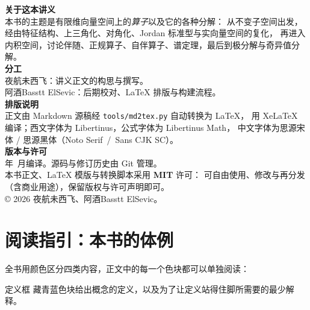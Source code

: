 \documentclass[UTF8, fontset=none, 11pt, twoside, openright]{ctexbook}
\newcommand{\authorone}{夜航未西飞}
\newcommand{\authortwo}{阿酒\;\textbullet\;Basstt ElSevic}
\newcommand{\bookdate}{\the\year 年\ \the\month 月}
\begin{document}
\thispagestyle{empty}
\null\vfill
\begin{flushleft}
\small\color{black!75}
\textsf{\textbf{\color{inkblue}关于这本讲义}}\\[4pt]
本书的主题是有限维向量空间上的\emph{算子}以及它的各种分解：
从不变子空间出发，经由特征结构、上三角化、对角化、Jordan 标准型与实向量空间的复化，
再进入内积空间，讨论伴随、正规算子、自伴算子、谱定理，最后到极分解与奇异值分解。\\[10pt]

\textsf{\textbf{\color{inkblue}分工}}\\[4pt]
\authorone{}：讲义正文的构思与撰写。\\
\authortwo{}：后期校对、\LaTeX{} 排版与构建流程。\\[10pt]

\textsf{\textbf{\color{inkblue}排版说明}}\\[4pt]
正文由 Markdown 源稿经 \texttt{tools/md2tex.py} 自动转换为 \LaTeX{}，
用 XeLaTeX 编译；西文字体为 Libertinus，公式字体为 Libertinus Math，
中文字体为思源宋体 / 思源黑体（Noto Serif~/~Sans CJK SC）。\\[10pt]

\textsf{\textbf{\color{inkblue}版本与许可}}\\[4pt]
\bookdate 编译。源码与修订历史由 Git 管理。\\
本书正文、\LaTeX{} 模版与转换脚本采用 \textbf{MIT} 许可：
可自由使用、修改与再分发（含商业用途），保留版权与许可声明即可。\\
\copyright{} 2026 \authorone、\authortwo。
\end{flushleft}
\vspace*{18mm}

\frontmatter
\pagestyle{fancy}

\chapter*{阅读指引：本书的体例}

全书用颜色区分四类内容，正文中的每一个色块都可以单独阅读：

\begin{jdefn*}{定义框}{}
藏青蓝色块给出概念的定义，以及为了让定义站得住脚所需要的最少解释。
\end{jdefn*}
\end{document}

